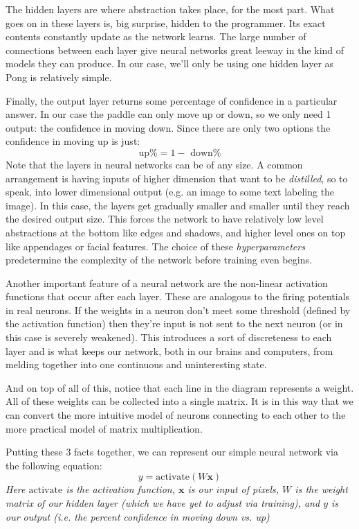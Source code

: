 \documentclass{article}
\begin{document}
The hidden layers are where
abstraction takes place, for the most part. What goes on in these layers is, big surprise, hidden to the programmer. Its exact contents constantly update as the network learns. The large number of connections between each layer give neural networks great leeway in the kind of models they can produce. In our case, we'll only be using one hidden layer as Pong is relatively simple.

Finally, the output layer returns some percentage of confidence in a particular answer. In our case the paddle can only move up or down, so we only need 1 output: the confidence in moving down. Since there are only two options the confidence in moving up is just:
$$\textrm{up\%}=1-\textrm{ down\%}$$
Note that the layers in neural networks can be of any size. A common arrangement is having inputs of higher dimension that want to be \textit{distilled}, so to speak, into lower dimensional output (e.g. an image to some text labeling the image). In this case, the layers get gradually smaller and smaller until they reach the desired output size. This forces the network to have relatively low level abstractions at the bottom like edges and shadows, and higher level ones on top like appendages or facial features. The choice of these \textit{hyperparameters} predetermine the complexity of the network before training even begins.

Another important feature of a neural network are the non-linear activation functions that occur after each layer. These are analogous to the firing potentials in real neurons. If the weights in a neuron don't meet some threshold (defined by the activation function) then they're input is not sent to the next neuron (or in this case is severely weakened). This introduces a sort of discreteness to each layer and is what keeps our network, both in our brains and computers, from melding together into one continuous and uninteresting state.

And on top of all of this, notice that each line in the diagram represents a weight. All of these weights can be collected into a single matrix. It is in this way that we can convert the more intuitive model of neurons connecting to each other to the more practical model of matrix multiplication.

Putting these 3 facts together, we can represent our simple neural network via the following equation:
$$y = \mathrm{activate}(W\mathbf x)$$
\textit{Here $\mathrm{activate}$ is the activation function, $\mathbf x$ is our input of pixels, $W$ is the weight matrix of our hidden layer (which we have yet to adjust via training), and $y$ is our output (i.e. the percent confidence in moving down vs. up)}
\end{document}
